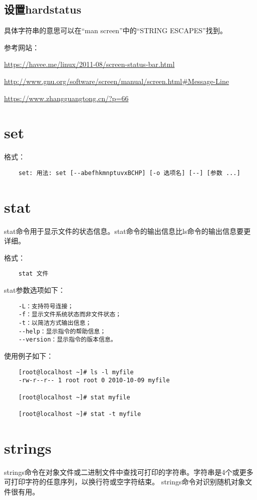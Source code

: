 \documentclass[a4paper,left=2.5cm,right=2.5cm,11pt]{article}
\begin{document}
\subsection{设置hardstatus}
	具体字符串的意思可以在“man screen”中的“STRING ESCAPES”找到。\par

	参考网站：\par
	\url{https://havee.me/linux/2011-08/screen-status-bar.html}\par
	\url{http://www.gnu.org/software/screen/manual/screen.html#Message-Line}\par
	\url{https://www.zhangguangtong.cn/?p=66}

\section{set}
	格式：
	\begin{lstlisting}
	set: 用法: set [--abefhkmnptuvxBCHP] [-o 选项名] [--] [参数 ...]
	\end{lstlisting}

\section{stat}
	stat命令用于显示文件的状态信息。stat命令的输出信息比ls命令的输出信息要更详细。\par

	格式：
	\begin{lstlisting}
	stat 文件
	\end{lstlisting}

	stat参数选项如下：
	\begin{lstlisting}
	-L：支持符号连接； 
	-f：显示文件系统状态而非文件状态； 
	-t：以简洁方式输出信息； 
	--help：显示指令的帮助信息； 
	--version：显示指令的版本信息。
	\end{lstlisting}

	使用例子如下：
	\begin{lstlisting}
	[root@localhost ~]# ls -l myfile 
	-rw-r--r-- 1 root root 0 2010-10-09 myfile 

	[root@localhost ~]# stat myfile 
	
	[root@localhost ~]# stat -t myfile 
	\end{lstlisting}

\section{strings}
	strings命令在对象文件或二进制文件中查找可打印的字符串。字符串是4个或更多可打印字符的任意序列，以换行符或空字符结束。 strings命令对识别随机对象文件很有用。\par
\end{document}
